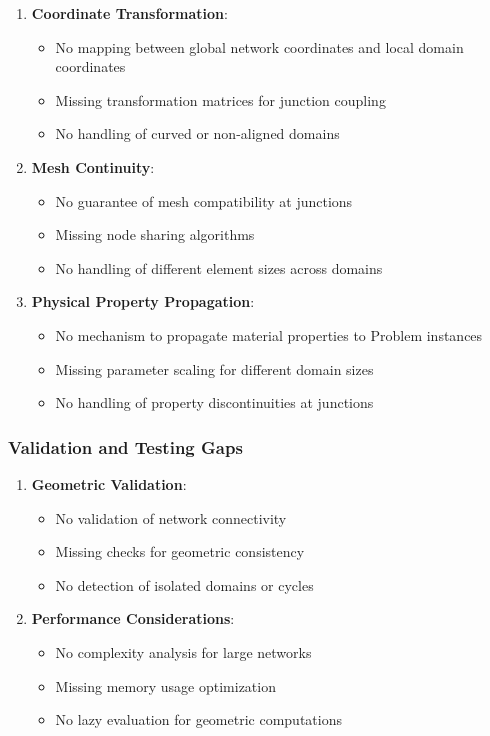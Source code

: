 \begin{enumerate}
    \item \textbf{Coordinate Transformation}:
    \begin{itemize}
        \item No mapping between global network coordinates and local domain coordinates
        \item Missing transformation matrices for junction coupling
        \item No handling of curved or non-aligned domains
    \end{itemize}
    
    \item \textbf{Mesh Continuity}:
    \begin{itemize}
        \item No guarantee of mesh compatibility at junctions
        \item Missing node sharing algorithms
        \item No handling of different element sizes across domains
    \end{itemize}
    
    \item \textbf{Physical Property Propagation}:
    \begin{itemize}
        \item No mechanism to propagate material properties to Problem instances
        \item Missing parameter scaling for different domain sizes
        \item No handling of property discontinuities at junctions
    \end{itemize}
\end{enumerate}

\subsubsection{Validation and Testing Gaps}

\begin{enumerate}
    \item \textbf{Geometric Validation}:
    \begin{itemize}
        \item No validation of network connectivity
        \item Missing checks for geometric consistency
        \item No detection of isolated domains or cycles
    \end{itemize}
    
    \item \textbf{Performance Considerations}:
    \begin{itemize}
        \item No complexity analysis for large networks
        \item Missing memory usage optimization
        \item No lazy evaluation for geometric computations
    \end{itemize}
\end{enumerate}

